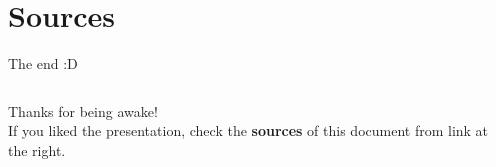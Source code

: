 \documentclass{beamer}
\begin{document}
\section{Sources}
\begin{frame} {The end :D}
  \begin{columns}
    Thanks for being awake! \\
    If you liked the presentation, check the \textbf{sources} of this document from link at the right.
  \end{columns}
\end{frame}
\end{document}
